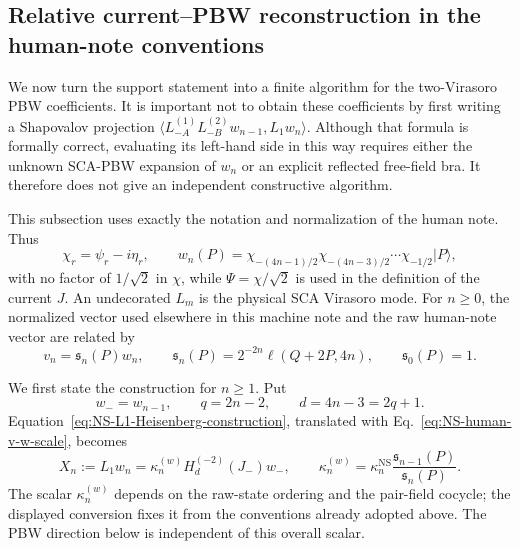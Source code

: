 \documentclass[11pt]{article}
\begin{document}
\subsection{Relative current--PBW reconstruction in the human-note
conventions}
\label{sec:NS-relative-current-PBW}

We now turn the support statement into a finite algorithm for the
two-Virasoro PBW coefficients.  It is important not to obtain these
coefficients by first writing a Shapovalov projection
\(\langle L_{-A}^{(1)}L_{-B}^{(2)}w_{n-1},L_1w_n\rangle\).
Although that formula is formally correct, evaluating its left-hand side
in this way requires either the unknown SCA-PBW expansion of \(w_n\) or an
explicit reflected free-field bra.  It therefore does not give an
independent constructive algorithm.

This subsection uses exactly the notation and normalization of the human
note.  Thus
\begin{equation}
 \chi_r=\psi_r-i\eta_r,
 \qquad
 w_n(P)=
 \chi_{-(4n-1)/2}\chi_{-(4n-3)/2}\cdots\chi_{-1/2}|P\rangle,
 \label{eq:NS-human-raw-w}
\end{equation}
with no factor of \(1/\sqrt2\) in \(\chi\), while
\(\Psi=\chi/\sqrt2\) is used in the definition of the current \(J\).
An undecorated \(L_m\) is the physical SCA Virasoro mode.  For \(n\geq0\),
the normalized vector used elsewhere in this machine note and the raw
human-note vector are related by
\begin{equation}
 v_n=\mathfrak s_n(P)w_n,
 \qquad
 \mathfrak s_n(P)=2^{-2n}\ell(Q+2P,4n),
 \qquad
 \mathfrak s_0(P)=1.
 \label{eq:NS-human-v-w-scale}
\end{equation}

We first state the construction for \(n\geq1\).  Put
\begin{equation}
 w_-=w_{n-1},
 \qquad
 q=2n-2,
 \qquad
 d=4n-3=2q+1.
 \label{eq:NS-relative-data}
\end{equation}
Equation~\eqref{eq:NS-L1-Heisenberg-construction}, translated with
Eq.~\eqref{eq:NS-human-v-w-scale}, becomes
\begin{equation}
 \boxed{
 X_n:=L_1w_n
 =\kappa_n^{(w)}H_d^{(-2)}(J_-)w_-,
 \qquad
 \kappa_n^{(w)}
 =\kappa_n^{\mathrm{NS}}
   \frac{\mathfrak s_{n-1}(P)}{\mathfrak s_n(P)}.}
 \label{eq:NS-human-L1-current-state}
\end{equation}
The scalar \(\kappa_n^{(w)}\) depends on the raw-state ordering and the
pair-field cocycle; the displayed conversion fixes it from the conventions
already adopted above.  The PBW direction below is independent of this
overall scalar.
\end{document}
